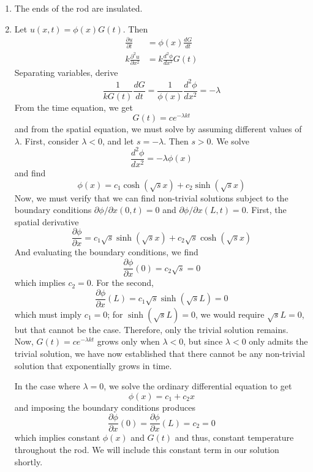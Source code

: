 \documentclass[a4paper]{article}
\begin{document}
\begin{enumerate}[label=(\alph*)]
	\item The ends of the rod are insulated.
	\item Let \( u \!\left( x,t \right) = \phi \!\left( x \right)G \!\left( t \right) \). Then
	\begin{align*}
		\frac{\partial u}{\partial t} & = \phi \!\left( x \right)\frac{d G}{d t} \\
		k \frac{\partial^2 u}{\partial x^2} & = k \frac{d^2 \phi}{d x^2}G \!\left( t \right)
	\end{align*}
	Separating variables, derive
	\[
		\frac{1}{k G \!\left( t \right)}\frac{d G}{d t} = \frac{1}{\phi \!\left( x \right)}\frac{d^2 \phi}{d x^2} = -\lambda
	\]
	From the time equation, we get
	\[
		G \!\left( t \right) = ce^{-\lambda kt} 
	\]
	and from the spatial equation, we must solve by assuming different values of \( \lambda \). First, consider \( \lambda < 0 \), and let \( s = -\lambda \). Then \( s > 0 \). We solve
	\[
		\frac{d^2 \phi}{d x^2} = -\lambda \phi \!\left( x \right) 
	\]
	and find
	\[
		\phi \!\left( x \right) = c_{1}\cosh\!\left(\sqrt{s}x\right) + c_{2}\sinh\!\left(\sqrt{s}x\right) 
	\]
	Now, we must verify that we can find non-trivial solutions subject to the boundary conditions \( \partial \phi / \partial x \!\left( 0,t \right) = 0 \) and \( \partial \phi / \partial x \!\left( L,t \right) = 0 \). First, the spatial derivative
	\[
		\frac{\partial \phi}{\partial x} = c_{1}\sqrt{s}\sinh\!\left(\sqrt{s}x\right) + c_{2}\sqrt{s}\cosh\!\left(\sqrt{s}x\right) 
	\]
	And evaluating the boundary conditions, we find
	\[
		\frac{\partial \phi}{\partial x}\!\left( 0 \right) = c_{2}\sqrt{s} = 0 
	\]
	which implies \( c_{2} = 0 \). For the second,
	\[
		\frac{\partial \phi}{\partial x}\!\left( L \right) = c_{1}\sqrt{s}\sinh\!\left(\sqrt{s}L\right) = 0 
	\]
	which must imply \( c_{1} = 0 \); for \( \sinh\!\left(\sqrt{s}L\right) = 0 \), we would require \( \sqrt{s}L = 0 \), but that cannot be the case. Therefore, only the trivial solution remains. Now, \( G \!\left( t \right) = ce^{-\lambda kt} \) grows only when \( \lambda < 0 \), but since \( \lambda < 0 \) only admits the trivial solution, we have now established that there cannot be any non-trivial solution that exponentially grows in time.

	In the case where \( \lambda = 0 \), we solve the ordinary differential equation to get
	\[
		\phi \!\left( x \right) = c_{1} + c_{2}x 
	\]
	and imposing the boundary conditions produces
	\[
		\frac{\partial \phi}{\partial x}\!\left( 0 \right) = \frac{\partial \phi}{\partial x}\!\left( L \right) = c_{2} = 0
	\]
	which implies constant \( \phi \!\left( x \right) \) and \( G \!\left( t \right) \) and thus, constant temperature throughout the rod. We will include this constant term in our solution shortly.


\end{enumerate}
\end{document}
